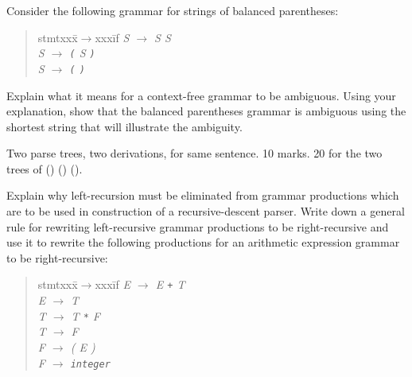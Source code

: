 \documentclass[11pt]{bareexam}
\begin{document}
\begin{questions}
\begin{subquestions}

%

\subquestion
Consider the following grammar for 
strings of balanced parentheses:
\begin{quote}
\begin{tabbing}
stmtxxx\=$\rightarrow$xxx\=if\kill
\it
S \> $\rightarrow$ \> {\it S\/} {\it S} \\
\it
S \> $\rightarrow$ \> \verb!(! {\it S\/} \verb!)! \\
\it
S \> $\rightarrow$ \> \verb!(! \verb!)!
\end{tabbing}
\end{quote}
Explain what it means for a context-free grammar to be ambiguous. 
Using your explanation, show that the balanced parentheses grammar is 
ambiguous using the shortest string that will illustrate the ambiguity.

\begin{modelanswer}
Two parse trees, two derivations, for same sentence. 10 marks.
20 for the two trees of () () ().
\end{modelanswer}


\subquestion

Explain why left-recursion must be eliminated from
grammar productions which are to be used in
construction of a recursive-descent parser.
Write down a general rule for rewriting left-recursive
grammar productions to be right-recursive and use it to 
rewrite the following productions for an
arithmetic expression grammar to be right-recursive:
\begin{quote}
\begin{tabbing}
stmtxxx\=$\rightarrow$xxx\=if\kill
\it
E \> $\rightarrow$ \> {\it E\/} \verb!+! {\it T} \\
\it
E \> $\rightarrow$ \> {\it T\/} \\
\it
T \> $\rightarrow$ \> {\it T\/} \verb!*! {\it F} \\
\it
T \> $\rightarrow$ \> {\it F\/} \\
\it
F \> $\rightarrow$ \> ( {\it E\/} ) \\
\it
F \> $\rightarrow$ \> \verb!integer!
\end{tabbing}
\end{quote}
\vspace{-1em}


\end{subquestions}
\end{questions}
\end{document}
